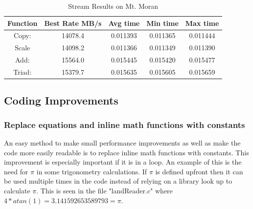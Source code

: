 \documentclass[]{article}%
\begin{document}
\begin{table}[ht]
\caption{Stream Results on Mt. Moran}
\centering
\begin{tabular}{c c  c c c}
\hline\hline
\hline
Function   & Best Rate MB/s & Avg time  &   Min time &    Max time \\ [0.5ex] 
\hline

Copy:    &     14078.4    & 0.011393    & 0.011365     & 0.011444\\
Scale     &  14098.2    & 0.011366     & 0.011349    & 0.011390\\
Add:      & 15564.0    & 0.015445     & 0.015420     & 0.015477\\
Triad:    & 15379.7    & 0.015635     & 0.015605     & 0.015659\\

\hline
\end{tabular}
\label{table:STREAM}
\end{table} 


\subsection{Coding Improvements}

\subsubsection{Replace equations  and inline math functions with constants}

An easy method to make small performance improvements as well as make the code more easily readable is to replace inline math functions with constants. This improvement is especially important if it is in a loop. An example of this is the need for $\pi$ in some trigonometry calculations. If $\pi$ is defined upfront then it can be used multiple times in the code instead of relying on a library look up to calculate $\pi$. This is seen in the file "landReader.c" where $4*atan(1) = 3.141592653589793 = \pi$.

\end{document}
